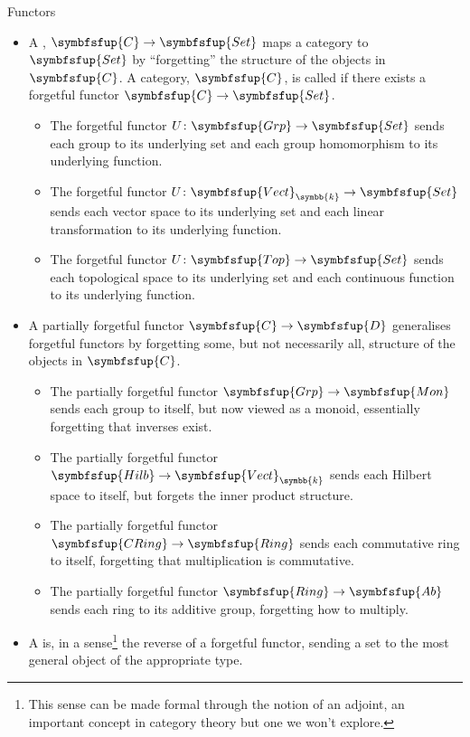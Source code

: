 \documentclass[fleqn]{NotesClass}
\makeatletter
\newcommand{\cat}[1]{\symbfsfup{#1}}
\newcommand{\c@egory}[1]{\symbfsfup{#1}}
\newcommand{\Set}{\c@egory{Set}}
\renewcommand{\field}{\symbb{k}}
\newcommand{\Vect}[1][\field]{{\c@egory{Vect}_{#1}}}
\newcommand{\Hilb}{\c@egory{Hilb}}
\newcommand{\Mon}{\c@egory{Mon}}
\newcommand{\Grp}{\c@egory{Grp}}
\newcommand{\Ring}{\c@egory{Ring}}
\newcommand{\CRing}{\c@egory{CRing}}
\newcommand{\Top}{\c@egory{Top}}
\newcommand{\Ab}{\c@egory{Ab}}
\makeatother
\begin{document}
\begin{exm}{Functors}{}
\begin{itemize}
            \item A , \(\cat{C} \to \Set\) maps a category to \(\Set\) by \enquote{forgetting} the structure of the objects in \(\cat{C}\).
            A category, \(\cat{C}\), is called  if there exists a forgetful functor \(\cat{C} \to \Set\).
            \begin{itemize}
                \item The forgetful functor \(U \colon \Grp \to \Set\) sends each group to its underlying set and each group homomorphism to its underlying function.
                \item The forgetful functor \(U \colon \Vect \to \Set\) sends each vector space to its underlying set and each linear transformation to its underlying function.
                \item The forgetful functor \(U \colon \Top \to \Set\) sends each topological space to its underlying set and each continuous function to its underlying function.
            \end{itemize}
            \item A partially forgetful functor \(\cat{C} \to \cat{D}\) generalises forgetful functors by forgetting some, but not necessarily all, structure of the objects in \(\cat{C}\).
            \begin{itemize}
                \item The partially forgetful functor \(\Grp \to \Mon\) sends each group to itself, but now viewed as a monoid, essentially forgetting that inverses exist.
                \item The partially forgetful functor \(\Hilb \to \Vect\) sends each Hilbert space to itself, but forgets the inner product structure.
                \item The partially forgetful functor \(\CRing \to \Ring\) sends each commutative ring to itself, forgetting that multiplication is commutative.
                \item The partially forgetful functor \(\Ring \to \Ab\) sends each ring to its additive group, forgetting how to multiply.
            \end{itemize}
            \item A  is, in a sense\footnote{This sense can be made formal through the notion of an adjoint, an important concept in category theory but one we won't explore.} the reverse of a forgetful functor, sending a set to the most general object of the appropriate type.

\end{itemize}
\end{exm}
\end{document}
